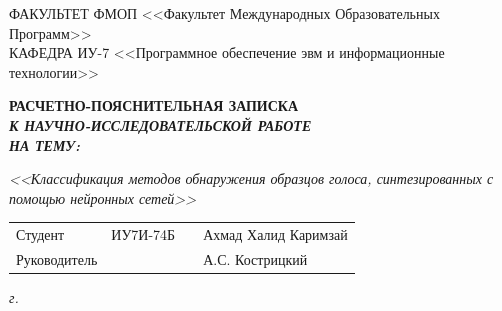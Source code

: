 \begin{titlepage}
	{
		\small \raggedright
		ФАКУЛЬТЕТ ФМОП <<Факультет Международных Образовательных Программ>> \\
		\vspace{3.3mm}
		КАФЕДРА ИУ-7 <<Программное обеспечение эвм и информационные технологии>> \\
	}
	
	\vspace{20.8mm}
	
	{
		\LARGE \bfseries
		РАСЧЕТНО-ПОЯСНИТЕЛЬНАЯ ЗАПИСКА \\
	}
	\vspace{5mm}
	{
		\Large \bfseries \itshape
		К НАУЧНО-ИССЛЕДОВАТЕЛЬСКОЙ РАБОТЕ \\
		\vspace{5mm}
		НА ТЕМУ: \\
	}
	
	{
		\Large \itshape
		<<Классификация методов обнаружения образцов голоса, синтезированных с помощью нейронных сетей>>
	}
	
	\vfill
	
	\begin{tabular}{p{}PPT}
		Студент &  ИУ7‌И-74Б & \uline{} & Ахмад Халид Каримзай \\
		Руководитель & ~ &  \uline{} & А.С. Кострицкий  \\
		
	\end{tabular}
	
	\vspace{14mm}
	
	\textit{{\the\year} г.}
	
\end{titlepage}